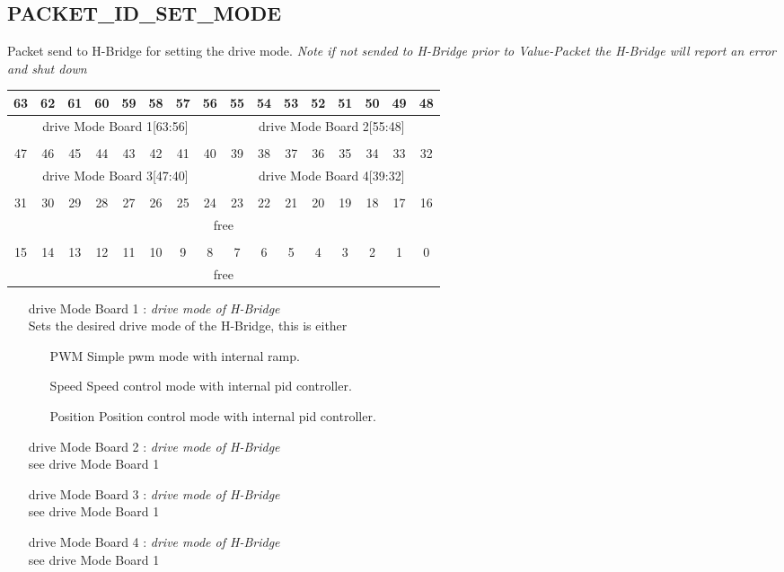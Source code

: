 \documentclass{article}
\begin{document}
\subsection{PACKET\_ID\_SET\_MODE}
Packet send to H-Bridge for setting the drive mode.
{\em Note if not sended to H-Bridge prior to Value-Packet the H-Bridge
  will report an error and shut down}\\
\begin{tabular} { c c c c c c c c c c c c c c c c}
  63&62&61&60&59&58&57&56&55&54&53&52&51&50&49&48\\
  \hline
  \multicolumn{8}{|c|}{ drive Mode Board 1[63:56]} & 
  \multicolumn{8}{|c|}{ drive Mode Board 2[55:48]} \\
  \hline
  \multicolumn{16}{c}{} \\
  47&46&45&44&43&42&41&40&39&38&37&36&35&34&33&32\\
  \hline
  \multicolumn{8}{|c|}{ drive Mode Board 3[47:40]} & 
  \multicolumn{8}{|c|}{ drive Mode Board 4[39:32]} \\
  \hline
  \multicolumn{16}{c}{} \\
  31&30&29&28&27&26&25&24&23&22&21&20&19&18&17&16\\
  \hline
  \multicolumn{16}{|c|}{free} \\ 
  \hline
  \multicolumn{16}{c}{} \\
  15&14&13&12&11&10&9&8&7&6&5&4&3&2&1&0\\
  \hline
  \multicolumn{16}{|c|}{free} \\ 
  \hline
\end{tabular}
\begin{itemize}
  \item[drive Mode Board 1 : ] {\it drive mode of H-Bridge}\\
    Sets the desired drive mode of the H-Bridge, this is either
    \begin{itemize}
      \item[PWM]
        Simple pwm mode with internal ramp.
      \item[Speed]
        Speed control mode with internal pid controller.
      \item[Position]
        Position control mode with internal pid controller.
    \end{itemize}
  \item[drive Mode Board 2 : ] {\it drive mode of H-Bridge}\\
    see drive Mode Board 1\\
  \item[drive Mode Board 3 : ] {\it drive mode of H-Bridge}\\
    see drive Mode Board 1\\
  \item[drive Mode Board 4 : ] {\it drive mode of H-Bridge}\\
    see drive Mode Board 1\\

\end{itemize}
\end{document}
